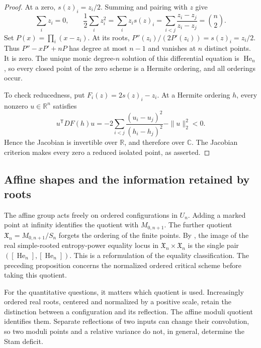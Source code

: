 \documentclass[12pt,reqno]{amsart}
\theoremstyle{definition}
\theoremstyle{remark}
\newcommand{\R}{\mathbb R}
\newcommand{\C}{\mathbb C}
\newcommand{\He}{\operatorname{He}}
\begin{document}
\begin{proof}
At a zero, \(s(z)_i=z_i/2\).  Summing and pairing with \(z\) give
\begin{equation}\label{eq:critical-normalizations}
 \sum_i z_i=0,
 \qquad \frac12\sum_i z_i^2
 =\sum_i z_i s(z)_i
 =\sum_{i<j}\frac{z_i-z_j}{z_i-z_j}
 =\binom n2.
\end{equation}
Set \(P(x)=\prod_i(x-z_i)\).  At its roots,
\(P''(z_i)/(2P'(z_i))=s(z)_i=z_i/2\).  Thus
\(P''-xP'+nP\) has degree at most \(n-1\) and vanishes at \(n\)
distinct points.  It is zero.  The unique monic degree-\(n\) solution
of this differential equation is \(\He_n\), so every closed point of
the zero scheme is a Hermite ordering, and all orderings occur.

To check reducedness, put \(F_i(z)=2s(z)_i-z_i\).  At a Hermite
ordering \(h\), every nonzero \(u\in\R^n\) satisfies
\begin{equation}\label{eq:critical-jacobian-negative}
 u^{\mathsf T}DF(h)u
 =-2\sum_{i<j}\frac{(u_i-u_j)^2}{(h_i-h_j)^2}
  -\|u\|_2^2<0.
\end{equation}
Hence the Jacobian is invertible over \(\R\), and therefore over
\(\C\).  The Jacobian criterion makes every zero a reduced isolated
point, as asserted.
\end{proof}

\subsection{Affine shapes and the information retained by roots}

The affine group acts freely on ordered configurations in \(U_n\).
Adding a marked point at infinity identifies the quotient with
\(M_{0,n+1}\).  The further quotient
\(\mathfrak X_n=M_{0,n+1}/S_n\) forgets the ordering of the finite
points.  By , the image of the real
simple-rooted entropy-power equality locus in
\(\mathfrak X_n\times\mathfrak X_n\) is the single pair
\(([\He_n],[\He_n])\).  This is a reformulation of the equality
classification.  The preceding proposition concerns the normalized
ordered critical scheme before taking this quotient.

For the quantitative questions, it matters which quotient is used.
Increasingly ordered real roots, centered and normalized by a positive
scale, retain the distinction between a configuration and its reflection.
The affine moduli quotient identifies them.  Separate reflections of two
inputs can change their convolution, so two moduli points and a relative
variance do not, in general, determine the Stam deficit.
\end{document}
